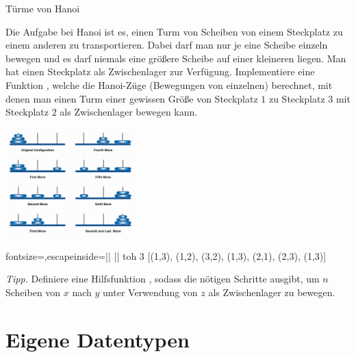 \documentclass{uebblatt}
\begin{document}
\begin{aufgabe}{Türme von Hanoi}
  \begin{minipage}[m]{0.67 \linewidth}
    Die Aufgabe bei Hanoi ist es, einen Turm von Scheiben von einem Steckplatz zu einem anderen zu transportieren. Dabei darf man nur je eine Scheibe einzeln bewegen und es darf niemals eine größere Scheibe auf einer kleineren liegen. Man hat einen Steckplatz als Zwischenlager zur Verfügung.
    Implementiere eine Funktion , welche die Hanoi-Züge (Bewegungen von einzelnen) berechnet, mit denen man einen Turm einer gewissen Größe von Steckplatz $1$ zu Steckplatz $3$ mit Steckplatz $2$ als Zwischenlager bewegen kann.
  \end{minipage}
  \begin{minipage}{0.32 \linewidth}
    \hfill \includegraphics[width=5cm]{towers-hanoi.png}
  \end{minipage}
  
  \begin{haskellcode*}{fontsize=\small,escapeinside=||}
|\ghci| toh 3
[(1,3), (1,2), (3,2), (1,3), (2,1), (2,3), (1,3)]
  \end{haskellcode*}
  
  {\scriptsize \emph{Tipp.} Definiere eine Hilfsfunktion , sodass  die nötigen Schritte ausgibt, um $n$ Scheiben von $x$ nach $y$ unter Verwendung von $z$ als Zwischenlager zu bewegen.\par}
\end{aufgabe}


\section{Eigene Datentypen}
\end{document}
